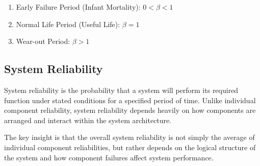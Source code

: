 \documentclass[twoside]{book}
\begin{document}
\begin{enumerate}
    \item {Early Failure Period (Infant Mortality):} $0<\beta<1$

    \item {Normal Life Period (Useful Life):} $\beta=1$

    \item {Wear-out Period:} $\beta>1$
\end{enumerate}


\subsection{System Reliability}

System reliability is the probability that a system will perform its required function under stated conditions for a specified period of time. Unlike individual component reliability, system reliability depends heavily on how components are arranged and interact within the system architecture.

The key insight is that the overall system reliability is not simply the average of individual component reliabilities, but rather depends on the logical structure of the system and how component failures affect system performance.
\end{document}
